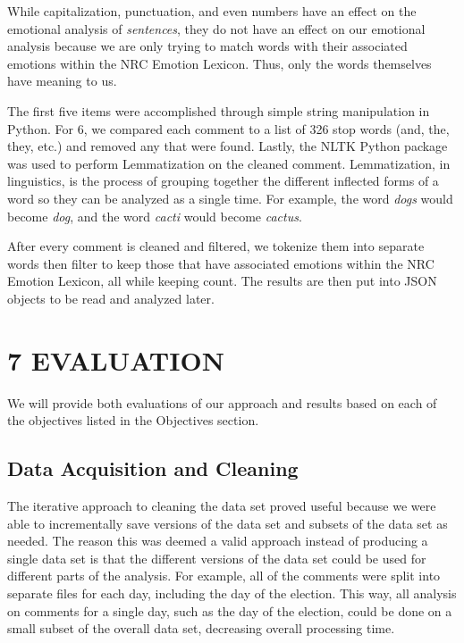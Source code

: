 \documentclass[letterpaper]{article}
\begin{document}
While capitalization, punctuation, and even numbers have an effect on the emotional analysis of \textit{sentences}, they do not have an effect on our emotional analysis because we are only trying to match words with their associated emotions within the NRC Emotion Lexicon. Thus, only the words themselves have meaning to us.

The first five items were accomplished through simple string manipulation in Python. For $6$, we compared each comment to a list of 326 stop words (and, the, they, etc.) and removed any that were found. Lastly, the NLTK Python package was used to perform Lemmatization on the cleaned comment. Lemmatization, in linguistics, is the process of grouping together the different inflected forms of a word so they can be analyzed as a single time. For example, the word \textit{dogs} would become \textit{dog}, and the word \textit{cacti} would become \textit{cactus}.

After every comment is cleaned and filtered, we tokenize them into separate words then filter to keep those that have associated emotions within the NRC Emotion Lexicon, all while keeping count. The results are then put into JSON objects to be read and analyzed later.


\section{7 EVALUATION}
We will provide both evaluations of our approach and results based on each of the objectives listed in the Objectives section.

\subsection{Data Acquisition and Cleaning}

The iterative approach to cleaning the data set proved useful because we were able to incrementally save versions of the data set and subsets of the data set as needed. The reason this was deemed a valid approach instead of producing a single data set is that the different versions of the data set could be used for different parts of the analysis. For example, all of the comments were split into separate files for each day, including the day of the election. This way, all analysis on comments for a single day, such as the day of the election, could be done on a small subset of the overall data set, decreasing overall processing time.
\end{document}
